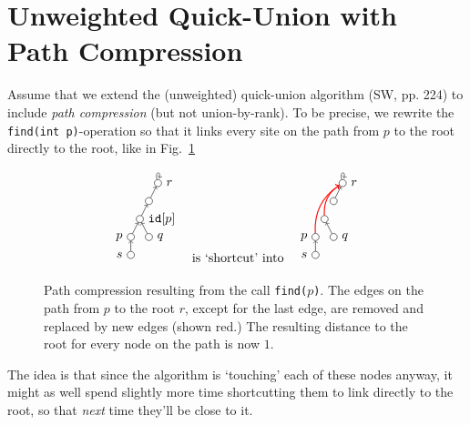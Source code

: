 \documentclass{tstextbook}
\begin{document}
\section{Unweighted Quick-Union with Path Compression}


Assume that we extend the (unweighted) quick-union algorithm (SW, pp. 224) to include \emph{path compression} (but not  union-by-rank).
To be precise, we rewrite the \texttt{find(int p)}-operation so that it links every site on the path from $p$ to the root directly to the root, like in Fig.~\ref{fig: path compression}

\begin{figure}[h]
  \[
  \begin{tikzpicture}[scale = .5]
  \node (p)    at (0,0) [circle, draw, inner sep = 2pt, label = left:$p$] {};
    \node (idp)  at (.5,1) [circle, draw, inner sep = 2pt, label = right:{$\mathtt{id}[p]$}] {};
  \node (dots) at (1,2) [circle, draw, inner sep = 2pt] {};
  \node (r)    at (1.5,3) [circle, draw, inner sep = 2pt, label = right:$r$] {};
    \node (q) at (1,0) [circle, draw, inner sep = 2pt, label = right:$q$] {};
    \node (s) at (0, -1) [circle, draw, inner sep = 2pt, label = left:$s$] {};
  \draw [->] (p) -- (idp);
  \draw [->] (q) -- (idp);
  \draw [->] (idp) -- (dots);
  \draw [->] (dots) -- (r);
    \draw[->] (s) -- (p);
  \path [->] (r) edge [loop above] (r);
\end{tikzpicture}
\quad
\text{is `shortcut' into}
\quad
  \begin{tikzpicture}[scale = .5]
  \node (p)    at (0,0) [circle, draw, inner sep = 2pt, label = left:$p$] {};
  \node (idp)  at (0.5,1) [circle, draw, inner sep = 2pt] {};
    \node (dots) at (1,2) [circle, draw, inner sep = 2pt] {};
  \node (r)    at (1.5,3) [circle, draw, inner sep = 2pt, label = right:$r$] {};
    \node (q) at (1,0) [circle, draw, inner sep = 2pt, label = right:$q$] {};
    \node (s) at (0, -1) [circle, draw, inner sep = 2pt, label = left:$s$] {};
    \path [->,thick, red] (p) edge[bend left] (r);
    \path [->,thick, red] (idp) edge[bend left] (r);
  \draw [->] (dots) -- (r);
  \path [->] (r) edge [loop above] (r);
  \draw [->] (q) -- (idp);
    \draw[->] (s) -- (p);
\end{tikzpicture}
\]
  \caption{\label{fig: path compression}
  Path compression resulting from the call \texttt{find($p$)}.
  The edges on the path from $p$ to the root $r$, except for the last edge, are removed and replaced by new edges (shown red.)
  The resulting distance to the root for every node on the path is now $1$.
  }
\end{figure}
The idea is that since the algorithm is `touching' each of these nodes anyway, it might as well spend slightly more time shortcutting them to link directly to the root, so that \emph{next} time they'll be close to it.
\end{document}
